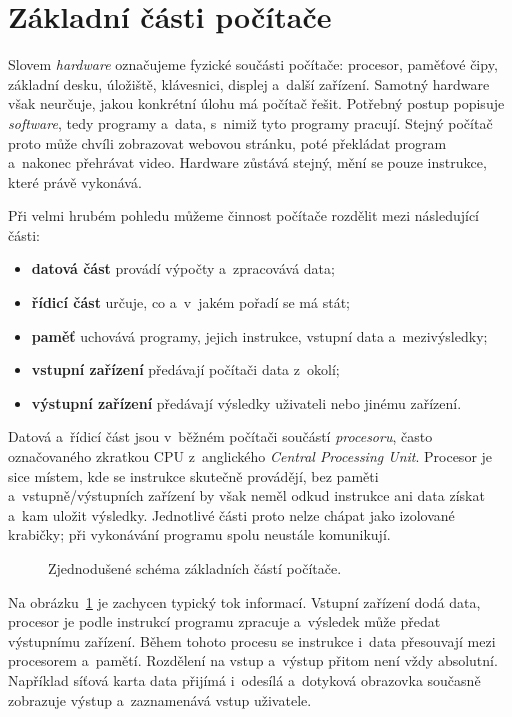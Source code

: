 \section{Základní části počítače}\label{sec:hw-zakladni-casti}

Slovem \emph{hardware} označujeme fyzické součásti počítače: procesor, paměťové čipy, základní desku, úložiště, klávesnici, displej a~další zařízení. Samotný hardware však neurčuje, jakou konkrétní úlohu má počítač řešit. Potřebný postup popisuje \emph{software}, tedy programy a~data, s~nimiž tyto programy pracují. Stejný počítač proto může chvíli zobrazovat webovou stránku, poté překládat program a~nakonec přehrávat video. Hardware zůstává stejný, mění se pouze instrukce, které právě vykonává.

Při velmi hrubém pohledu můžeme činnost počítače rozdělit mezi následující části:
\begin{itemize}
    \item \textbf{datová část} provádí výpočty a~zpracovává data;
    \item \textbf{řídicí část} určuje, co a~v~jakém pořadí se má stát;
    \item \textbf{paměť} uchovává programy, jejich instrukce, vstupní data a~mezivýsledky;
    \item \textbf{vstupní zařízení} předávají počítači data z~okolí;
    \item \textbf{výstupní zařízení} předávají výsledky uživateli nebo jinému zařízení.
\end{itemize}

Datová a~řídicí část jsou v~běžném počítači součástí \emph{procesoru}, často označovaného zkratkou CPU z~anglického \emph{Central Processing Unit}. Procesor je sice místem, kde se instrukce skutečně provádějí, bez paměti a~vstupně/výstupních zařízení by však neměl odkud instrukce ani data získat a~kam uložit výsledky. Jednotlivé části proto nelze chápat jako izolované krabičky; při vykonávání programu spolu neustále komunikují.

\begin{figure}[ht]
    \centering
    
    \caption{Zjednodušené schéma základních částí počítače.}
    \label{fig:hw-zakladni-casti}
\end{figure}

Na obrázku~\ref{fig:hw-zakladni-casti} je zachycen typický tok informací. Vstupní zařízení dodá data, procesor je podle instrukcí programu zpracuje a~výsledek může předat výstupnímu zařízení. Během tohoto procesu se instrukce i~data přesouvají mezi procesorem a~pamětí. Rozdělení na vstup a~výstup přitom není vždy absolutní. Například síťová karta data přijímá i~odesílá a~dotyková obrazovka současně zobrazuje výstup a~zaznamenává vstup uživatele.

